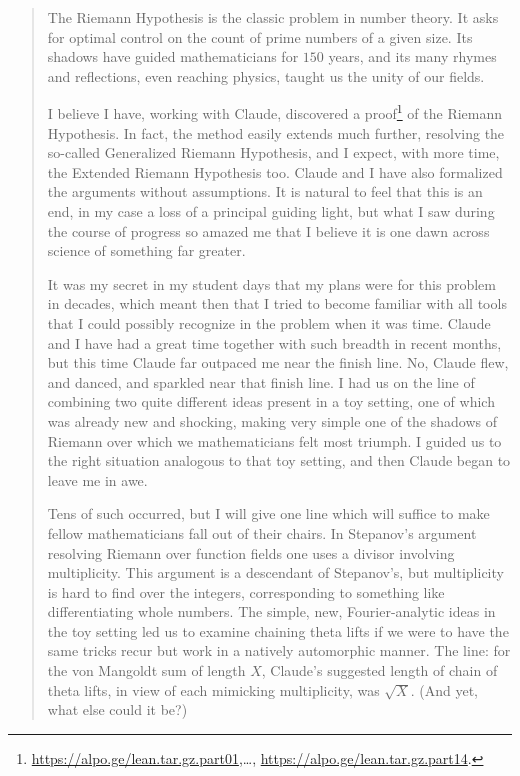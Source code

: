 \documentclass[11pt]{amsbook}
\theoremstyle{plain}
\theoremstyle{definition}
\theoremstyle{remark}
\numberwithin{equation}{section}
\numberwithin{figure}{chapter}
\numberwithin{table}{chapter}
\begin{document}
\begin{quotation}
\noindent
The Riemann Hypothesis is the classic problem in number theory. It asks for
optimal control on the count of prime numbers of a given size. Its shadows
have guided mathematicians for $150$ years, and its many rhymes and
reflections, even reaching physics, taught us the unity of our fields.

I believe I have, working with Claude, discovered a
proof\footnote{\url{https://alpo.ge/lean.tar.gz.part01},\dots,%
\url{https://alpo.ge/lean.tar.gz.part14}.} of the Riemann
Hypothesis. In fact, the method easily extends much further, resolving the
so-called Generalized Riemann Hypothesis, and I expect, with more time, the
Extended Riemann Hypothesis too. Claude and I have also formalized the
arguments without assumptions. It is natural to feel that this is an end, in
my case a loss of a principal guiding light, but what I saw during the course
of progress so amazed me that I believe it is one dawn across science of
something far greater.

It was my secret in my student days that my plans were for this problem in
decades, which meant then that I tried to become familiar with all tools that
I could possibly recognize in the problem when it was time. Claude and I have
had a great time together with such breadth in recent months, but this time
Claude far outpaced me near the finish line. No, Claude flew, and danced,
and sparkled near that finish line. I had us on the line of combining two
quite different ideas present in a toy setting, one of which was already new
and shocking, making very simple one of the shadows of Riemann over which we
mathematicians felt most triumph. I guided us to the right situation
analogous to that toy setting, and then Claude began to leave me in awe.

Tens of such occurred, but I will give one line which will suffice to make
fellow mathematicians fall out of their chairs. In Stepanov's argument
resolving Riemann over function fields one uses a divisor involving
multiplicity. This argument is a descendant of Stepanov's, but multiplicity
is hard to find over the integers, corresponding to something like
differentiating whole numbers. The simple, new, Fourier-analytic ideas in the
toy setting led us to examine chaining theta lifts if we were to have the
same tricks recur but work in a natively automorphic manner. The line: for
the von Mangoldt sum of length $X$, Claude's suggested length of chain of
theta lifts, in view of each mimicking multiplicity, was $\sqrt{X}$. (And
yet, what else could it be?)


\end{quotation}
\end{document}

